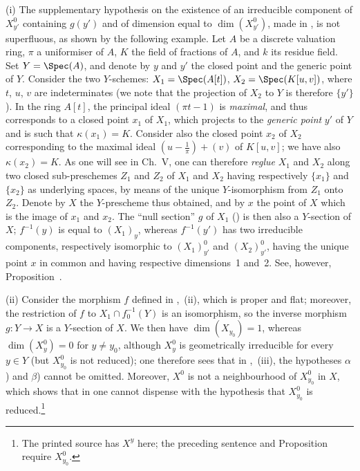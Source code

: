 \begin{remarks}[15.6.10]
\label{IV.15.6.10}
(i)
The supplementary hypothesis on the existence of an irreducible component of $X_{y'}^0$ containing $g(y')$ and of dimension equal to $\dim(X_{y'}^0)$, made in , is not superfluous, as shown by the following example.
Let $A$ be a discrete valuation ring, $\pi$ a uniformiser of $A$, $K$ the field of fractions of $A$, and $k$ its residue field. Set $Y=\Spec(A)$, and denote by $y$ and $y'$ the closed point and the generic point of $Y$.
Consider the two $Y$-schemes: $X_1=\Spec(A[t])$, $X_2=\Spec(K[u,v])$, where $t$, $u$, $v$ are indeterminates (we note that the projection of $X_2$ to $Y$ is therefore $\{y'\}$).
In the ring $A[t]$, the principal ideal $(\pi t-1)$ is \emph{maximal}, and thus corresponds to a closed point $x_1$ of $X_1$, which projects to the \emph{generic point} $y'$ of $Y$ and is such that $\kappa(x_1)=K$.
Consider also the closed point $x_2$ of $X_2$ corresponding to the maximal ideal $\left(u-\frac{1}{\pi}\right)+(v)$ of $K[u,v]$; we have also $\kappa(x_2)=K$.
As one will see in Ch.\ V, one can therefore \emph{reglue} $X_1$ and $X_2$ along two closed sub-preschemes $Z_1$ and $Z_2$ of $X_1$ and $X_2$ having respectively $\{x_1\}$ and $\{x_2\}$ as underlying spaces, by means of the unique $Y$-isomorphism from $Z_1$ onto $Z_2$.
Denote by $X$ the $Y$-prescheme thus obtained, and by $x$ the point of $X$ which is the image of $x_1$ and $x_2$.
The ``null section'' $g$ of $X_1$ () is then also a $Y$-section of $X$; $f^{-1}(y)$ is equal to $(X_1)_y$, whereas $f^{-1}(y')$ has two irreducible components, respectively isomorphic to $(X_1)_{y'}^0$ and $(X_2)_{y'}^0$, having the unique point $x$ in common and having respective dimensions~1 and~2. See, however, Proposition~.

(ii)
Consider the morphism $f$ defined in ,~(ii), which is proper and flat; moreover, the restriction of $f$ to $X_1\cap f_0^{-1}(Y)$ is an isomorphism, so the inverse morphism $g:Y\to X$ is a $Y$-section of $X$.
We then have $\dim(X_{y_0})=1$, whereas $\dim(X_y^0)=0$ for $y\neq y_0$, although $X_y^0$ is geometrically irreducible for every $y\in Y$ (but $X_{y_0}^0$ is not reduced); one therefore sees that in ,~(iii), the hypotheses $\alpha$) and $\beta$) cannot be omitted.
Moreover, $X^0$ is not a neighbourhood of $X_{y_0}^0$ in $X$, which shows that in  one cannot dispense with the hypothesis that $X_{y_0}^0$ is reduced.\footnote{The printed source has $X^y$ here; the preceding sentence and Proposition~ require $X_{y_0}^0$.}


\end{remarks}
